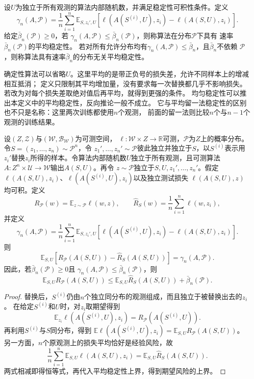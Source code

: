 \begin{definition}[平均稳定性]
\label{def:on-average-stability}
设$U$为独立于所有观测的算法内部随机数，并满足稳定性可积性条件。定义
\begin{equation}
 \gamma_n(A,\mathcal P)
 =\frac1n\sum_{i=1}^n\mathbb E_{S,z_i',U}
 \left[\ell(A(S^{(i)},U),z_i)-\ell(A(S,U),z_i)\right].
 \label{eq:on-average-stability}
\end{equation}
给定$\bar\beta_n(\mathcal P)\geq0$，若
$\gamma_n(A,\mathcal P)\leq\bar\beta_n(\mathcal P)$，则称算法在分布$\mathcal P$下具有
速率$\bar\beta_n(\mathcal P)$的平均稳定性。
若对所有允许分布均有$\gamma_n(A,\mathcal P)\leq\bar\beta_n$，且$\bar\beta_n$不依赖
$\mathcal P$，则称算法具有速率$\bar\beta_n$的分布无关平均稳定性。
\end{definition}

确定性算法可以省略$U$。这里平均的是带正负号的损失差，允许不同样本上的增减相互抵消；
定义只限制其平均增加量，没有要求每一次替换都几乎不影响损失。
若改为对每个损失差取绝对值后再平均，就得到更强的条件。
均匀稳定性可以推出本定义中的平均稳定性，反向推论一般不成立。
它与平均留一法稳定性的区别也不只是名称：这里两次训练都使用$n$个观测，
前面的留一法则比较$n$个与$n-1$个观测的训练结果。

\begin{theorem}[平均稳定性与期望风险]
\label{thm:on-average-generalization}
设$(Z,\mathcal Z)$与$(\mathcal W,\mathcal B_{\mathcal W})$为可测空间，
$\ell:\mathcal W\times Z\to\mathbb R$可测，$\mathcal P$为$Z$上的概率分布。
令$S=(z_1,\ldots,z_n)\sim\mathcal P^n$，令
$z_1',\ldots,z_n'\sim\mathcal P$彼此独立并独立于$S$，以$S^{(i)}$表示用
$z_i'$替换$z_i$所得的样本。令算法内部随机数$U$独立于所有观测，且可测算法
$A:Z^n\times\mathcal U\to\mathcal W$输出$A(S,U)$。再令
$z\sim\mathcal P$独立于$S,U,z_1',\ldots,z_n'$。假定
$\ell(A(S,U),z_i)$、$\ell(A(S^{(i)},U),z_i)$以及独立测试损失
$\ell(A(S,U),z)$均可积。定义
\[
 R_{\mathcal P}(w)=\mathbb E_{z\sim\mathcal P}\ell(w,z),
 \qquad
 \hat R_S(w)=\frac1n\sum_{i=1}^n\ell(w,z_i),
\]
并定义
\[
 \gamma_n(A,\mathcal P)
 =\frac1n\sum_{i=1}^n\mathbb E_{S,z_i',U}
 \left[\ell(A(S^{(i)},U),z_i)-\ell(A(S,U),z_i)\right].
\]
则
\begin{equation}
 \mathbb E_{S,U}\left[R_{\mathcal P}(A(S,U))-\hat R_S(A(S,U))\right]
 =\gamma_n(A,\mathcal P).
 \label{eq:on-average-generalization-identity}
\end{equation}
因此，若$\bar\beta_n(\mathcal P)\geq0$且
$\gamma_n(A,\mathcal P)\leq\bar\beta_n(\mathcal P)$，则
\[
 \mathbb E_{S,U}R_{\mathcal P}(A(S,U))
 \leq\mathbb E_{S,U}\hat R_S(A(S,U))+\bar\beta_n(\mathcal P).
\]
\end{theorem}
\begin{proof}
替换后，$S^{(i)}$仍由$n$个独立同分布的观测组成，而且独立于被替换出去的$z_i$。
在给定$S^{(i)}$和$U$时，对$z_i$取期望得到
\[
 \mathbb E_{z_i}\ell(A(S^{(i)},U),z_i)
 =R_{\mathcal P}(A(S^{(i)},U)).
\]
再利用$S^{(i)}$与$S$同分布，得到
$\mathbb E\ell(A(S^{(i)},U),z_i)=\mathbb E_{S,U}R_{\mathcal P}(A(S,U))$。
另一方面，$n$个原观测上的损失平均恰好是经验风险，故
\[
 \frac1n\sum_{i=1}^n\mathbb E_{S,U}\ell(A(S,U),z_i)
 =\mathbb E_{S,U}\hat R_S(A(S,U)).
\]
两式相减即得恒等式，再代入平均稳定性上界，得到期望风险的上界。
\end{proof}

